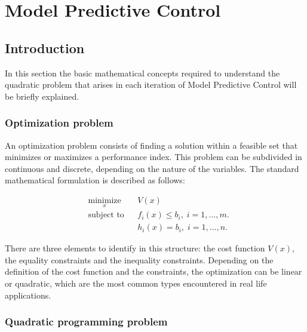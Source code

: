 \chapter{Model Predictive Control}
\label{chap:Model_Predictive_Control}

\section{Introduction}

In this section the basic mathematical concepts required to understand the quadratic problem that arises in each iteration of Model Predictive Control will be briefly explained.

\subsection{Optimization problem}%

An optimization problem consists of finding a solution within a feasible set that minimizes or maximizes a performance index. This problem can be subdivided in continuous and discrete, depending on the nature of the variables. The standard mathematical formulation is described as follows:

\begin{equation} \label{eq:gen_qp}
 \begin{aligned}
 & \underset{x}{\text{minimize}}
 & & V(x) \\
 & \text{subject to}
 & & f_i(x) \leq b_i, \; i = 1, \ldots, m.\\
 &
 & & h_i(x) = b_i, \; i = 1, \ldots, n.
 \end{aligned}
\end{equation}

There are three elements to identify in this structure: the cost function $V(x)$, the equality constraints and the inequality constraints. Depending on the definition of the cost function and the constraints, the optimization can be linear or quadratic, which are the most common types encountered in real life applications. 

\subsection{Quadratic programming problem}%

